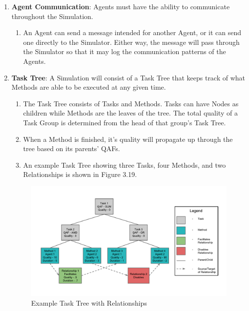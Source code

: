 \begin{enumerate}
    
    \item\textbf{Agent Communication}: Agents must have the ability to communicate throughout the Simulation.
    \begin{enumerate}
    \item An Agent can send a message intended for another Agent, or it can send one directly to the Simulator. Either way, the message will pass through the Simulator so that it may log the communication patterns of the Agents.
  \end{enumerate}
  
  \item\textbf{Task Tree}: A Simulation will consist of a Task Tree that keeps track of what Methods are able to be executed at any given time.
   \begin{enumerate}
    \item The Task Tree consists of Tasks and Methods. Tasks can have Nodes as children while Methods are the leaves of the tree. The total quality of a Task Group is determined from the head of that group's Task Tree.
    \item When a Method is finished, it's quality will propagate up through the tree based on its parents' QAFs.
    \item An example Task Tree showing three Tasks, four Methods, and two Relationships is shown in Figure 3.19.
  \end{enumerate}

\begin{figure}[H]
\centering
\includegraphics[width=6.5in]{figs/TaskTree.pdf}
\caption{Example Task Tree with Relationships}
\label{fig:TaskTree}
\end{figure}
  

\end{enumerate}
